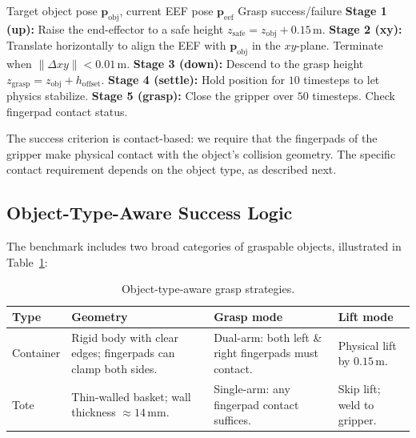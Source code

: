 \begin{algorithm}[H]
\caption{Scripted 5-stage grasp.}
\label{alg:scripted_grasp}
\begin{algorithmic}[1]
\Require Target object pose $\mathbf{p}_{\text{obj}}$, current EEF pose $\mathbf{p}_{\text{eef}}$
\Ensure Grasp success/failure
\State \textbf{Stage 1 (up):} Raise the end-effector to a safe height $z_{\text{safe}} = z_{\text{obj}} + 0.15\,\mathrm{m}$.
\State \textbf{Stage 2 (xy):} Translate horizontally to align the EEF with $\mathbf{p}_{\text{obj}}$ in the $xy$-plane. Terminate when $\|\Delta xy\| < 0.01\,\mathrm{m}$.
\State \textbf{Stage 3 (down):} Descend to the grasp height $z_{\text{grasp}} = z_{\text{obj}} + h_{\text{offset}}$.
\State \textbf{Stage 4 (settle):} Hold position for $10$ timesteps to let physics stabilize.
\State \textbf{Stage 5 (grasp):} Close the gripper over $50$ timesteps.
\State \Return Check fingerpad contact status.
\end{algorithmic}
\end{algorithm}

The success criterion is contact-based: we require that the fingerpads of the gripper make physical contact with the object's collision geometry. The specific contact requirement depends on the object type, as described next.

\subsection{Object-Type-Aware Success Logic}
\label{sec:scripted_grasp:object_types}

The benchmark includes two broad categories of graspable objects, illustrated in Table~\ref{tab:object_types}:

\begin{table}[h]
\centering
\caption{Object-type-aware grasp strategies.}
\label{tab:object_types}
\small
\begin{tabular}{p{} p{} p{} p{}}
\toprule
\textbf{Type} & \textbf{Geometry} & \textbf{Grasp mode} & \textbf{Lift mode} \\
\midrule
Container & Rigid body with clear edges; fingerpads can clamp both sides. & Dual-arm: both left \& right fingerpads must contact. & Physical lift by $0.15\,\mathrm{m}$. \\
Tote & Thin-walled basket; wall thickness $\approx 14\,\mathrm{mm}$. & Single-arm: any fingerpad contact suffices. & Skip lift; weld to gripper. \\
\bottomrule
\end{tabular}
\end{table}

